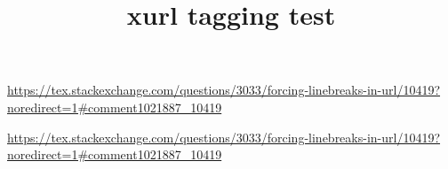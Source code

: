 \documentclass{article}
\title{xurl tagging test}
\begin{document}
\url{https://tex.stackexchange.com/questions/3033/forcing-linebreaks-in-url/10419?noredirect=1#comment1021887_10419}

{\useOriginalUrlSetting\url{https://tex.stackexchange.com/questions/3033/forcing-linebreaks-in-url/10419?noredirect=1#comment1021887_10419}}
\end{document}
